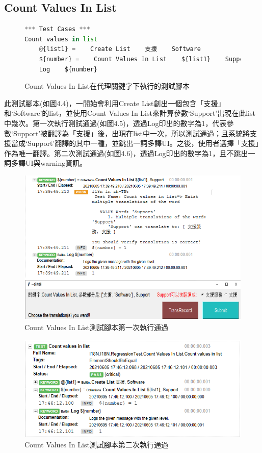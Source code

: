 \subsection{Count Values In List}
\begin{figure}[H]
\begin{lstlisting}[language={python}]
*** Test Cases ***
Count values in list
    @{list1} =    Create List    支援    Software
    ${number} =    Count Values In List    ${list1}    Support
    Log    ${number}
\end{lstlisting}
\caption{Count Values In List在代理關鍵字下執行的測試腳本}
\end{figure}
此測試腳本(如圖4.4)，一開始會利用Create List創出一個包含「支援」和‘Software’的list，並使用Count Values In List來計算參數‘Support’出現在此list中幾次。第一次執行測試通過(如圖4.5)，透過Log印出的數字為1，代表參數‘Support’被翻譯為「支援」後，出現在list中一次，所以測試通過；且系統將支援當成‘Support’翻譯的其中一種，並跳出一詞多譯UI。之後，使用者選擇「支援」作為唯一翻譯。第二次測試通過(如圖4.6)，透過Log印出的數字為1，且不跳出一詞多譯UI與warning資訊。

\begin{figure}[H]
\centering
\includegraphics[width= .9\textwidth]{../論文截圖/4.1.2-2 count values in list 1st run.png}
\caption{Count Values In List測試腳本第一次執行通過}
\end{figure}

\begin{figure}[H]
\includegraphics[width= \textwidth]{../論文截圖/4.1.2-3 count values in list 2nd run.png}
\caption{Count Values In List測試腳本第二次執行通過}
\end{figure}

